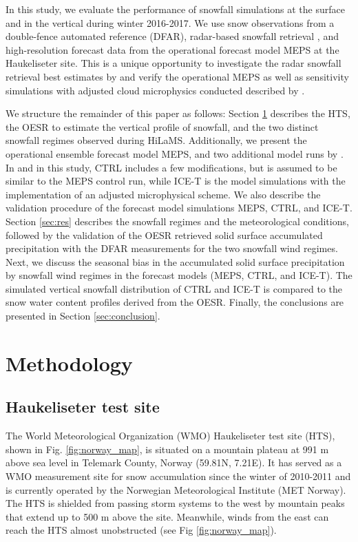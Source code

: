 \documentclass{ametsocV5}
\begin{document}
    In this study, we evaluate the performance of snowfall simulations at the surface and in the vertical during winter 2016-2017. We use snow observations from a double-fence automated reference (DFAR), radar-based snowfall retrieval \citep{cooper_variational_2017,schirle_estimation_2019}, and high-resolution forecast data from the operational forecast model MEPS at the Haukeliseter site. This is a unique opportunity to investigate the radar snowfall retrieval best estimates by \citet{schirle_estimation_2019} and verify the operational MEPS as well as sensitivity simulations with adjusted cloud microphysics conducted described by \citet{engdahl_effects_2020}.
    
    We structure the remainder of this paper as follows: Section \ref{sec:methodology} describes the HTS, the \citet{schirle_estimation_2019} OESR to estimate the vertical profile of snowfall, and the two distinct snowfall regimes observed during HiLaMS. Additionally, we present the operational ensemble forecast model MEPS, and two additional model runs by \citet{engdahl_effects_2020}. In \citet{engdahl_effects_2020} and in this study, CTRL includes a few modifications, but is assumed to be similar to the MEPS control run, while ICE-T is the model simulations with the implementation of an adjusted microphysical scheme. We also describe the  validation procedure of the forecast model simulations MEPS, CTRL, and ICE-T. Section \ref{sec:res} describes the snowfall regimes and the meteorological conditions, followed by the validation of the OESR retrieved solid surface accumulated precipitation with the DFAR measurements for the two snowfall wind regimes. Next, we discuss the seasonal bias in the accumulated solid surface precipitation by snowfall wind regimes in the forecast models (MEPS, CTRL, and ICE-T). The simulated vertical snowfall distribution of CTRL and ICE-T is compared to the snow water content profiles derived from the OESR. Finally, the conclusions are presented in Section \ref{sec:conclusion}.



\section{Methodology}\label{sec:methodology}
    \subsection{Haukeliseter test site}
        The World Meteorological Organization (WMO) Haukeliseter test site (HTS), shown in Fig. \ref{fig:norway_map}, is situated on a mountain plateau at 991 m above sea level in Telemark County, Norway (59.81\textdegree N, 7.21\textdegree E). It has served as a WMO measurement site for snow accumulation since the winter of 2010-2011 \citep{wolff_new_2010} and is currently operated by the Norwegian Meteorological Institute (MET Norway). The HTS is shielded from passing storm systems to the west by mountain peaks that extend up to 500 m above the site. Meanwhile, winds from the east can reach the HTS almost unobstructed (see Fig \ref{fig:norway_map}).  
    
\end{document}
